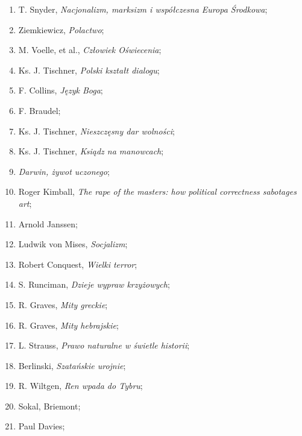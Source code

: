 \documentclass[a4paper,11pt]{article}
\begin{document}
\begin{enumerate}
\item T. Snyder, \textit{Nacjonalizm, marksizm i współczesna Europa
    Środkowa};

\item Ziemkiewicz, \textit{Polactwo};

\item M. Voelle, et al., \textit{Człowiek Oświecenia};

\item Ks. J. Tischner, \textit{Polski kształt dialogu};

\item F. Collins, \textit{Język Boga};

\item F. Braudel;

\item Ks. J. Tischner, \textit{Nieszczęsny dar wolności};

\item Ks. J. Tischner, \textit{Ksiądz na manowcach};

\item \textit{Darwin, żywot uczonego};

\item Roger Kimball, \textit{The rape of the masters: how political
    correctness sabotages art};

\item Arnold Janssen;

\item Ludwik von Mises, \textit{Socjalizm};

\item Robert Conquest, \textit{Wielki terror};

\item S. Runciman, \textit{Dzieje wypraw krzyżowych};

\item R. Graves, \textit{Mity greckie};

\item R. Graves, \textit{Mity hebrajskie};

\item L. Strauss, \textit{Prawo naturalne w świetle historii};

\item Berlinski, \textit{Szatańskie urojnie};

\item R. Wiltgen, \textit{Ren wpada do Tybru};

\item Sokal, Briemont;

\item Paul Davies;


\end{enumerate}
\end{document}
